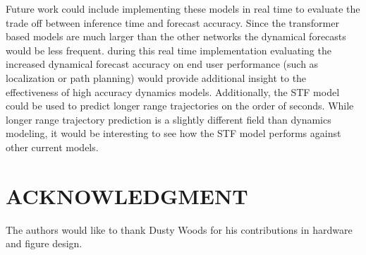 \documentclass[letterpaper, 10 pt, conference]{ieeeconf}  %
\begin{document}
Future work could include implementing these models in real time to evaluate the trade off between inference time and forecast accuracy. Since the transformer based models are much larger than the other networks the dynamical forecasts would be less frequent. during this real time implementation evaluating the increased dynamical forecast accuracy on end user performance (such as localization or path planning) would provide additional insight to the effectiveness of high accuracy dynamics models.  Additionally, the STF model could be used to predict longer range trajectories on the order of seconds. While longer range trajectory prediction is a slightly different field than dynamics modeling, it would be interesting to see how the STF model performs against other current models.


\addtolength{\textheight}{-8cm}   %








\section*{ACKNOWLEDGMENT}

The authors would like to thank Dusty Woods for his contributions in hardware and figure design.






\end{document}
